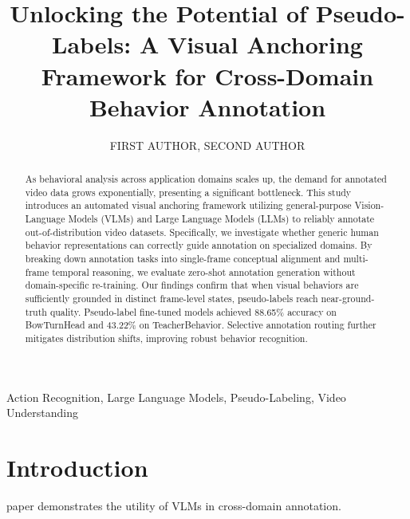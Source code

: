 \documentclass{ieeeaccess}
\begin{document}

\title{Unlocking the Potential of Pseudo-Labels: A Visual Anchoring Framework for Cross-Domain Behavior Annotation}
\author{\uppercase{First Author}, \uppercase{Second Author}}
\address[1]{Institution}

\begin{abstract}
As behavioral analysis across application domains scales up, the demand for annotated video data grows exponentially, presenting a significant bottleneck. This study introduces an automated visual anchoring framework utilizing general-purpose Vision-Language Models (VLMs) and Large Language Models (LLMs) to reliably annotate out-of-distribution video datasets. Specifically, we investigate whether generic human behavior representations can correctly guide annotation on specialized domains. By breaking down annotation tasks into single-frame conceptual alignment and multi-frame temporal reasoning, we evaluate zero-shot annotation generation without domain-specific re-training. 
Our findings confirm that when visual behaviors are sufficiently grounded in distinct frame-level states, pseudo-labels reach near-ground-truth quality. Pseudo-label fine-tuned models achieved 88.65\% accuracy on BowTurnHead and 43.22\% on TeacherBehavior. Selective annotation routing further mitigates distribution shifts, improving robust behavior recognition.
\end{abstract}

\begin{keywords}
Action Recognition, Large Language Models, Pseudo-Labeling, Video Understanding
\end{keywords}

\titlepgskip=-21pt
\maketitle
\section{Introduction}
 paper demonstrates the utility of VLMs in cross-domain annotation. 
\EOD
\end{document}
